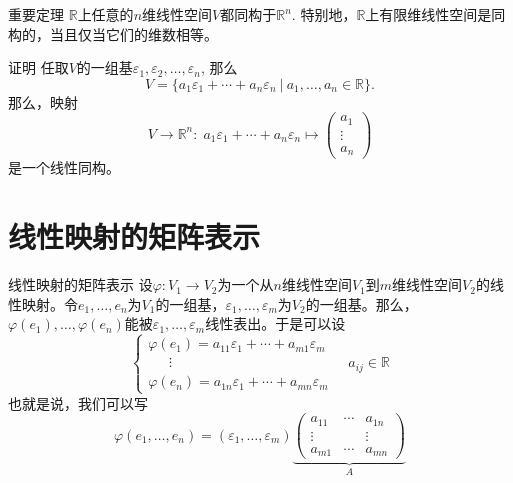 
\begin{frame}

\begin{block}{重要定理}
$\mathbb{R}$上任意的$n$维线性空间$V$都同构于$\mathbb{R}^n$. 特别地，$\mathbb{R}$上有限维线性空间是同构的，当且仅当它们的维数相等。
\end{block}

\begin{block}{证明}
任取$V$的一组基$\varepsilon_1, \varepsilon_2, \ldots, \varepsilon_n$, 那么
\[V = \{ a_1\varepsilon_1 + \cdots + a_n\varepsilon_n \ |\ a_1,\ldots,a_n\in\mathbb{R} \}.\]
那么，映射
\[V \to \mathbb{R}^n: \; a_1\varepsilon_1 + \cdots + a_n\varepsilon_n \mapsto \begin{pmatrix} a_1 \\ \vdots \\ a_n \end{pmatrix}\]
是一个线性同构。
\end{block}

\end{frame}


\section{线性映射的矩阵表示}


\begin{frame}

\begin{block}{线性映射的矩阵表示}
设$\varphi: V_1 \to V_2$为一个从$n$维线性空间$V_1$到$m$维线性空间$V_2$的线性映射。令$e_1, \ldots, e_n$为$V_1$的一组基，$\varepsilon_1, \ldots, \varepsilon_m$为$V_2$的一组基。那么，$\varphi(e_1), \ldots, \varphi(e_n)$能被$\varepsilon_1, \ldots, \varepsilon_m$线性表出。于是可以设
\[
\begin{cases}
\varphi(e_1) = a_{11}\varepsilon_1 + \cdots + a_{m1}\varepsilon_m \\
\phantom{yyy} \vdots \\
\varphi(e_n) = a_{1n}\varepsilon_1 + \cdots + a_{mn}\varepsilon_m
\end{cases} \quad a_{ij}\in\mathbb{R}
\]
也就是说，我们可以写
\[\varphi(e_1, \ldots, e_n) = (\varepsilon_1, \ldots, \varepsilon_m) \underbrace{\begin{pmatrix}
a_{11} & \cdots & a_{1n} \\ \vdots & & \vdots \\ a_{m1} & \cdots & a_{mn} \end{pmatrix}}_{A}\]
\end{block}

\end{frame}

